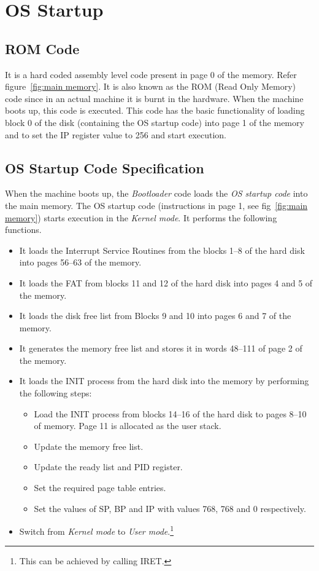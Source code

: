 \chapter{OS Startup}
\label{chp:osstartup}

\section{ROM Code}
\label{lbl:romcode}
It is a hard coded assembly level code present in page 0 of the memory. Refer figure~\ref{fig:main memory}.
It is also known as the ROM (Read Only Memory) code since in an actual machine it is burnt in the hardware. When the machine boots up, this code is executed. This code has the basic functionality of loading block 0 of the disk (containing the OS startup code) into page 1 of the memory and to set the IP register value to 256 and start execution.

\section{OS Startup Code Specification}
\label{lbl:oscode}
When the machine boots up, the \textit{Bootloader} code loads the \textit{OS startup code} into the main memory. The OS startup code (instructions in page 1, see fig~\ref{fig:main memory}) starts execution in the \textit{Kernel mode}. It performs the following functions.
\begin{itemize}
	\item It loads the Interrupt Service Routines from the blocks 1--8 of the hard disk into pages 56--63 of the memory.
	\item It loads the FAT from blocks 11 and 12 of the hard disk into pages 4 and 5 of the memory.
	\item It loads the disk free list from Blocks 9 and 10 into pages 6 and 7 of the memory.
	\item It generates the memory free list and stores it in words 48--111 of page 2 of the memory.
	\item It loads the INIT process from the hard disk into the memory by performing the following steps:
	\begin{itemize}
		\item Load the INIT process from blocks 14--16 of the hard disk to pages 8--10 of memory. Page 11 is allocated as the user stack.
		\item Update the memory free list.
		\item Update the ready list and PID register.
		\item Set the required page table entries.
		\item Set the values of SP, BP and IP with values 768, 768 and 0 respectively.
	\end{itemize}
	\item Switch from \textit{Kernel mode} to \textit{User mode}.\footnote{This can be achieved by calling IRET.}
\end{itemize}

